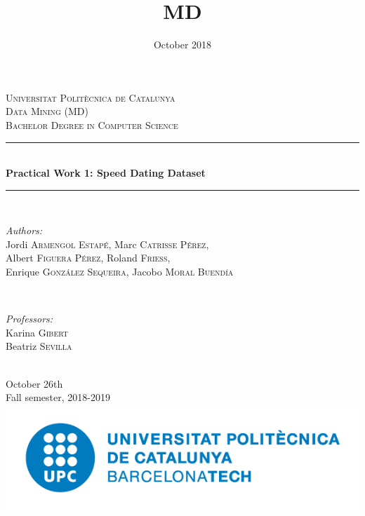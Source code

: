 \documentclass[11pt]{article}
\title{MD}
\date{October 2018}
\begin{document}

\begin{titlepage}

\newcommand{\HRule}{\rule{\linewidth}{0.5mm}} 
\center %
\textsc{\LARGE Universitat Polit\`ecnica de Catalunya}\\[1.5cm] %
\textsc{\Large Data Mining (MD)}\\[0.5cm] %
\textsc{\large Bachelor Degree in Computer Science}\\[0.5cm] %
\HRule \\[0.4cm]
{\huge \bfseries Practical Work 1: Speed Dating Dataset}\\[0.4cm] %
\HRule \\[1.5cm]

\begin{minipage}{0.9\textwidth}
\begin{center} \large
\emph{Authors:}\\
Jordi \textsc{Armengol Estapé},
Marc \textsc{Catrisse Pérez},\\
Albert \textsc{Figuera Pérez},
Roland \textsc{Frieß},\\
Enrique \textsc{González Sequeira},
Jacobo \textsc{Moral Buendía}
\end{center}
\end{minipage}\\[1.1cm]

\begin{minipage}{0.9\textwidth}
\begin{center} \large
\emph{Professors:} \\
Karina \textsc{Gibert} \\%
Beatriz \textsc{Sevilla}
\end{center}
\end{minipage}\\[2cm]
{\large October 26th}\\
{\large Fall semester, 2018-2019}\\[2cm] 
\includegraphics[scale=0.6]{logoUPC.png}
\\[1cm] 
\vfill 
\end{titlepage}
\tableofcontents
\newpage
\end{document}
